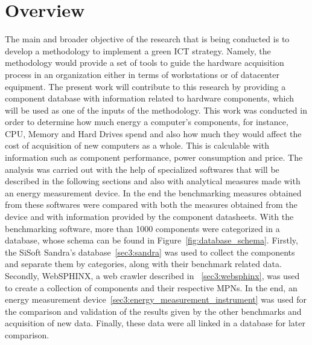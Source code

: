 \section{Overview} \label{sec3:overview}
    The main and broader objective of the research that is being conducted is to develop a methodology to implement a green ICT strategy. Namely, the methodology would provide a set of tools to guide the hardware acquisition process in an organization either in terms of workstations or of datacenter equipment. The present work will contribute to this research by providing a component database with information related to hardware components, which will be used as one of the inputs of the methodology. This work was conducted in order to determine how much energy a computer's components, for instance, CPU, Memory and Hard Drives spend and also how much they would affect the cost of acquisition of new computers as a whole. This is calculable with information such as component performance, power consumption and price. The analysis was carried out with the help of specialized softwares that will be described in the following sections and also with analytical measures made with an energy measurement device. In the end the benchmarking measures obtained from these softwares were compared with both the measures obtained from the device and with information provided by the component datasheets. With the benchmarking software, more than 1000 components were categorized in a database, whose schema can be found in Figure~\ref{fig:database_schema}. Firstly, the SiSoft Sandra's database~\ref{sec3:sandra} was used to collect the components and separate them by categories, along with their benchmark related data. Secondly, WebSPHINX, a web crawler described in ~\ref{sec3:websphinx}, was used to create a collection of components and their respective MPNs. In the end, an energy measurement device~\ref{sec3:energy_measurement_instrument} was used for the comparison and validation of the results given by the other benchmarks and acquisition of new data. 
    Finally, these data were all linked in a database for later comparison. 

